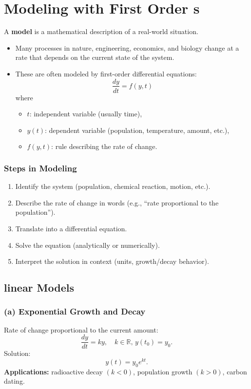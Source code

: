 \chapter{Modeling with First Order \ode{}s}
A \textbf{model} is a mathematical description of a real-world situation.
\begin{itemize}
    \item Many processes in nature, engineering, economics, and biology change at a rate that depends on the current state of the system.
    \item These are often modeled by first-order differential equations:
    \[
    \frac{dy}{dt} = f(y,t)
    \]
    where
    \begin{itemize}
        \item $t$: independent variable (usually time),
        \item $y(t)$: dependent variable (population, temperature, amount, etc.),
        \item $f(y,t)$: rule describing the rate of change.
    \end{itemize}
\end{itemize}


\subsection*{Steps in Modeling}
  \begin{enumerate}
      \item Identify the system (population, chemical reaction, motion, etc.).
      \item Describe the rate of change in words (e.g., ``rate proportional to the population'').
      \item Translate into a differential equation.
      \item Solve the equation (analytically or numerically).
      \item Interpret the solution in context (units, growth/decay behavior).
  \end{enumerate}


\section{linear Models}
\subsection*{(a) Exponential Growth and Decay}
  Rate of change proportional to the current amount:
  \[
  \frac{dy}{dt} = ky, \quad k \in \mathbb{R}, \, y(t_0) = y_0.
  \]
  Solution:
  \[
  y(t) = y_0 e^{kt}.
  \]
  \textbf{Applications:} radioactive decay $(k<0)$, population growth $(k>0)$, carbon dating.

